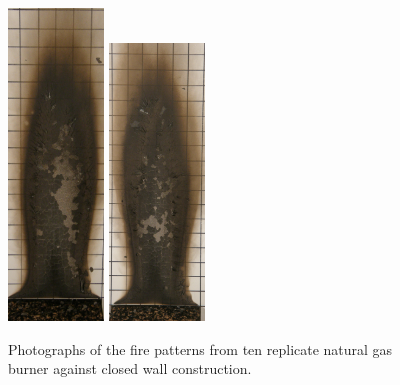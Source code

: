 \documentclass[twoside]{uocthesis}
\begin{document}
{\begin{figure}[p]
	\includegraphics[width=1.0in]{../Figures/GBNG22_P5130403}
	\includegraphics[width=1.0in]{../Figures/GBNG23_P5130412} \\

	\caption[Photographs of the fire patterns from ten replicate natural gas burner against closed wall construction]{Photographs of the fire patterns from ten replicate natural gas burner against closed wall construction.}
	\label{NG_Closed_Wall}
\end{figure}

}
\end{document}
